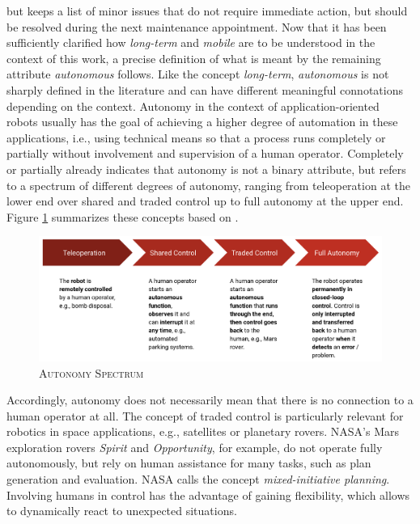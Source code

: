 \documentclass[english, master, utf8]{base/thesis_KBS}
\begin{document}
but keeps a list of minor issues that do not require immediate action, but should be resolved during the next maintenance
appointment.\newline
Now that it has been sufficiently clarified how \textit{long-term} and \textit{mobile} are to be understood in the context of this work,
a precise definition of what is meant by the remaining attribute \textit{autonomous} follows.
Like the concept \textit{long-term}, \textit{autonomous} is not sharply defined in the literature and can have different meaningful connotations depending
on the context. Autonomy in the context of application-oriented robots usually has the goal of achieving a higher degree of automation in these applications,
i.e., using technical means so that a process runs completely or partially without involvement and supervision of a human operator. \cite{Hertzberg:2015}
Completely or partially already indicates that autonomy is not a binary attribute, but refers to a spectrum of different degrees of autonomy,
ranging from teleoperation at the lower end over shared and traded control up to full autonomy at the upper end. \cite{Hertzberg:2015}
Figure \ref{fig:autonomy_spectrum} summarizes these concepts based on \cite{Hertzberg:2015}.
\begin{figure}[H]
    \centering
    \includegraphics[width=\textwidth]{pics/autonomy_spectrum.png}
    \caption{\textsc{Autonomy Spectrum}}
    \label{fig:autonomy_spectrum}
\end{figure}
\noindent
Accordingly, autonomy does not necessarily mean that there is no connection to a human operator at all.
The concept of traded control is particularly relevant for robotics in space applications, e.g., satellites or planetary rovers.
NASA's Mars exploration rovers \textit{Spirit} and \textit{Opportunity}, for example, do not operate fully autonomously, but rely on human assistance for many tasks,
such as plan generation and evaluation. \cite{Bresina:2005} NASA calls the concept \textit{mixed-initiative planning}. Involving humans in control has the advantage of gaining
flexibility, which allows to dynamically react to unexpected situations. \cite{Bresina:2005}
\end{document}

